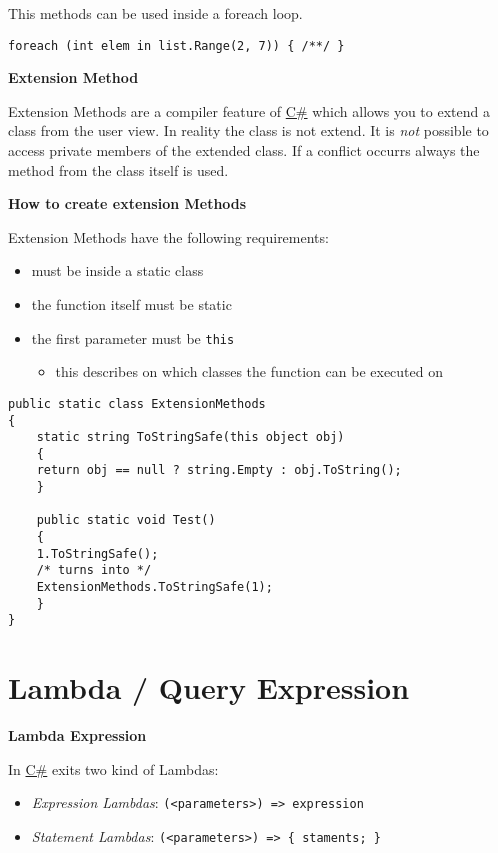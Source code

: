 \documentclass[11pt,twoside,landscape]{article}
\begin{document}
\begin{multicols}{3}
This methods can be used inside a foreach loop.
\lstset{language=csharp,label= ,caption= ,captionpos=b,numbers=none}
\begin{lstlisting}
foreach (int elem in list.Range(2, 7)) { /**/ }
\end{lstlisting}

\textbf{Extension Method}

Extension Methods are a compiler feature of \href{../../../roam/20211003114158-c.org}{C\#} which allows you to extend a class from the user view.
In reality the class is not extend.
It is \emph{not} possible to access private members of the extended class.
If a conflict occurrs always the method from the class itself is used.

\textbf{How to create extension Methods}

Extension Methods have the following requirements:
\begin{itemize}
\item must be inside a static class
\item the function itself must be static
\item the first parameter must be \texttt{this}
\begin{itemize}
\item this describes on which classes the function can be executed on
\end{itemize}
\end{itemize}

\lstset{language=csharp,label= ,caption= ,captionpos=b,numbers=none}
\begin{lstlisting}
public static class ExtensionMethods
{
    static string ToStringSafe(this object obj)
    {
	return obj == null ? string.Empty : obj.ToString();
    }

    public static void Test()
    {
	1.ToStringSafe();
	/* turns into */
	ExtensionMethods.ToStringSafe(1);
    }
}
\end{lstlisting}

\section{Lambda / Query Expression}
\label{sec:org0aebf42}

\textbf{Lambda Expression}

In \href{../../../roam/20211003114158-c.org}{C\#} exits two kind of Lambdas:
\begin{itemize}
\item \emph{Expression Lambdas}:  \texttt{(<parameters>) => expression}
\item \emph{Statement Lambdas}: \texttt{(<parameters>) => \{ staments; \}}
\end{itemize}



\end{multicols}
\end{document}
